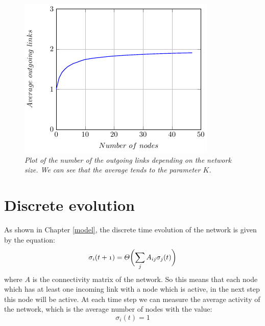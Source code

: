 \begin{figure}[h]
\centering
\includegraphics[scale=1.5]{images/outgoing.pdf}
\caption{\emph{Plot of the number of the outgoing links depending on the network size. We can see that the average tends to the parameter $K$. }}
\label{fig:outgoing}
\end{figure}




\section{Discrete evolution}
As shown in Chapter \ref{model}, the discrete time evolution of the network is given by the equation:
$$
\mathnormal{\sigma_i(t+1)=\Theta\biggl(\sum_jA_{ij}\sigma_j(t)\biggr)}
$$
where $A$ is the connectivity matrix of the network.
So this means that each node which has at least one incoming link with a node which is active, in the next step this node will be active.
At each time step we can measure the average activity of the network, which is the average number of nodes with the value:
$$
\sigma_i(t) = 1
$$


